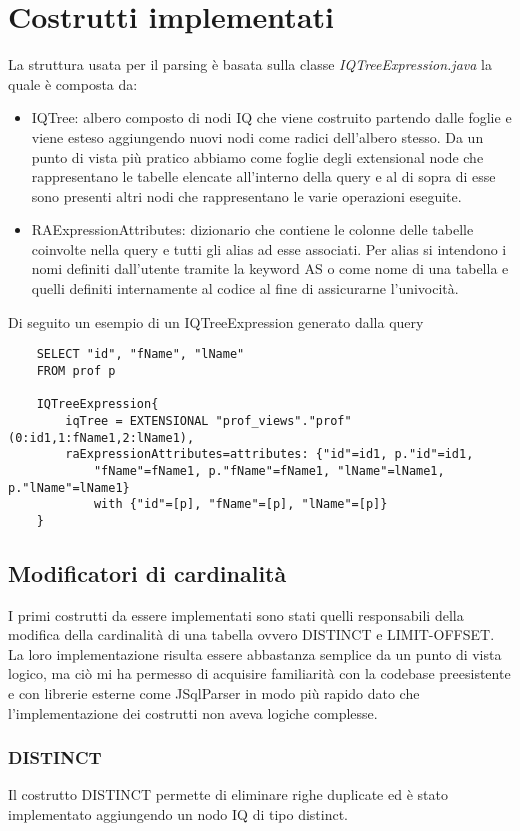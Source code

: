 \section{Costrutti implementati}
\label{sec:implementation}
La struttura usata per il parsing è basata sulla classe \textit{IQTreeExpression.java} la quale è composta da:
\begin{itemize}
    \item IQTree: albero composto di nodi IQ che viene costruito partendo dalle foglie e viene esteso aggiungendo nuovi nodi come radici dell'albero stesso. Da un punto di vista
          più pratico abbiamo come foglie degli extensional node che rappresentano le tabelle elencate all'interno della query e al di sopra di esse sono presenti altri nodi che
          rappresentano le varie operazioni eseguite.
    \item RAExpressionAttributes: dizionario che contiene le colonne delle tabelle coinvolte nella query e tutti gli alias ad esse associati. Per alias si intendono i nomi definiti
          dall'utente tramite la keyword AS o come nome di una tabella e quelli definiti internamente al codice al fine di assicurarne l'univocità.
\end{itemize}
Di seguito un esempio di un IQTreeExpression generato dalla query
\begin{verbatim}
    SELECT "id", "fName", "lName"
    FROM prof p

    IQTreeExpression{
        iqTree = EXTENSIONAL "prof_views"."prof"(0:id1,1:fName1,2:lName1), 
        raExpressionAttributes=attributes: {"id"=id1, p."id"=id1, 
            "fName"=fName1, p."fName"=fName1, "lName"=lName1, p."lName"=lName1} 
            with {"id"=[p], "fName"=[p], "lName"=[p]}
    } 
    \end{verbatim}

\subsection{Modificatori di cardinalità}
I primi costrutti da essere implementati sono stati quelli responsabili della modifica della cardinalità di una tabella ovvero DISTINCT e LIMIT-OFFSET. La loro implementazione
risulta essere abbastanza semplice da un punto di vista logico, ma ciò mi ha permesso di acquisire familiarità con la codebase preesistente e con librerie esterne come JSqlParser
in modo più rapido dato che l'implementazione dei costrutti non aveva logiche complesse.

\subsubsection*{DISTINCT}
Il costrutto DISTINCT permette di eliminare righe duplicate ed è stato implementato aggiungendo un nodo IQ di tipo distinct.

